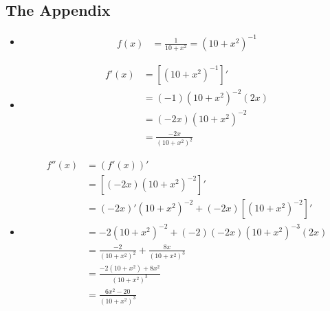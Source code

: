 \documentclass[12pt]{article}
\begin{document}
\newpage
\begin{center}
    \section*{The Appendix}
\end{center}
 \begin{itemize}
    \item 
    \begin{align*}
        f(x) &= \frac{1}{10+x^2} = \left(10+x^2 \right)^{-1}
    \end{align*}
    
    \item
    \begin{align*}
        f'(x) &= \left[\left(10+x^2 \right)^{-1} \right]'\\
        &= \left(-1 \right) \left(10+x^2 \right)^{-2} \left(2x \right)\\
        &= \left(-2x \right) \left(10+x^2 \right)^{-2}\\
        &= \frac{-2x}{\left(10+x^2 \right)^2}
    \end{align*}
    
    \item
    \begin{align*}
        f''(x) &= \left(f'(x) \right)'\\
        &= \left[ \left(-2x \right) \left(10+x^2 \right)^{-2}\right]'\\
        &= \left(-2x \right)'\left(10+x^2 \right)^{-2}
        + \left(-2x \right) \left[\left(10+x^2 \right)^{-2} \right]'\\
        &= -2\left(10+x^2 \right)^{-2}
        + \left(-2 \right) \left(-2x \right) \left(10+x^2 \right)^{-3} \left(2x \right)\\
        &= \frac{-2}{\left(10+x^2 \right)^{2}}
        + \frac{8x}{\left(10+x^2 \right)^{3}}\\
        &= \frac{-2\left(10+x^2 \right)+ 8x^2}{\left(10+x^2 \right)^{3}}\\
        &= \frac{6x^2- 20}{\left(10+x^2 \right)^{3}}
    \end{align*}
    

\end{itemize}
\end{document}
